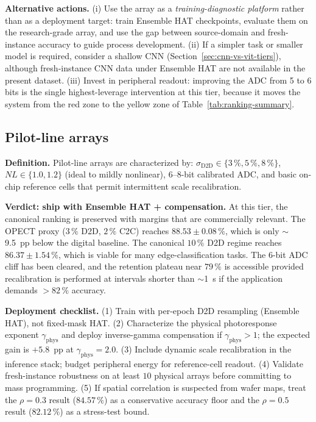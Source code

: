 \textbf{Alternative actions.}  (i) Use the array as a \emph{training-diagnostic platform} rather than as a deployment target: train Ensemble HAT checkpoints, evaluate them on the research-grade array, and use the gap between source-domain and fresh-instance accuracy to guide process development.  (ii) If a simpler task or smaller model is required, consider a shallow CNN (Section~\ref{sec:cnn-vs-vit-tiers}), although fresh-instance CNN data under Ensemble HAT are not available in the present dataset.  (iii) Invest in peripheral readout: improving the ADC from 5 to 6 bits is the single highest-leverage intervention at this tier, because it moves the system from the red zone to the yellow zone of Table~\ref{tab:ranking-summary}.

\subsection{Pilot-line arrays}

\textbf{Definition.}  Pilot-line arrays are characterized by: $\sigma_{\mathrm{D2D}} \in \{3\,\%, 5\,\%, 8\,\%\}$, $NL \in \{1.0, 1.2\}$ (ideal to mildly nonlinear), $6$--$8$-bit calibrated ADC, and basic on-chip reference cells that permit intermittent scale recalibration.

\textbf{Verdict: ship with Ensemble HAT + compensation.}  At this tier, the canonical ranking is preserved with margins that are commercially relevant.  The OPECT proxy ($3\,\%$ D2D, $2\,\%$ C2C) reaches $88.53\pm0.08\,\%$, which is only $\sim$9.5~pp below the digital baseline.  The canonical $10\,\%$ D2D regime reaches $86.37\pm1.54\,\%$, which is viable for many edge-classification tasks.  The 6-bit ADC cliff has been cleared, and the retention plateau near $79\,\%$ is accessible provided recalibration is performed at intervals shorter than $\sim$1~s if the application demands $>82\,\%$ accuracy.

\textbf{Deployment checklist.}  (1) Train with per-epoch D2D resampling (Ensemble HAT), not fixed-mask HAT.  (2) Characterize the physical photoresponse exponent $\gamma_{\mathrm{phys}}$ and deploy inverse-gamma compensation if $\gamma_{\mathrm{phys}} > 1$; the expected gain is $+5.8$~pp at $\gamma_{\mathrm{phys}}=2.0$.  (3) Include dynamic scale recalibration in the inference stack; budget peripheral energy for reference-cell readout.  (4) Validate fresh-instance robustness on at least $10$ physical arrays before committing to mass programming.  (5) If spatial correlation is suspected from wafer maps, treat the $\rho=0.3$ result ($84.57\,\%$) as a conservative accuracy floor and the $\rho=0.5$ result ($82.12\,\%$) as a stress-test bound.

